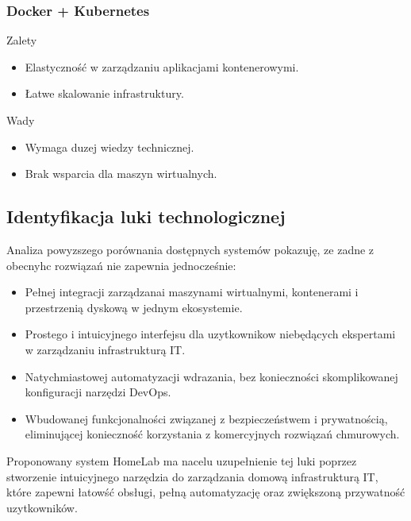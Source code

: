 \subsubsection{Docker + Kubernetes}
\begin{minipage}{0.45\textwidth}
    Zalety
    \begin{itemize}
        \item Elastyczność w zarządzaniu aplikacjami kontenerowymi.
        \item Łatwe skalowanie infrastruktury.
    \end{itemize}
\end{minipage}\hfil
\begin{minipage}{0.45\textwidth}
    Wady
    \begin{itemize}
        \item Wymaga duzej wiedzy technicznej.
        \item Brak wsparcia dla maszyn wirtualnych.
    \end{itemize}
\end{minipage}


\subsection{Identyfikacja luki technologicznej}
Analiza powyzszego porównania dostępnych systemów pokazuję, ze zadne z obecnyhc rozwiązań nie zapewnia jednocześnie:
\begin{itemize}
    \item Pełnej integracji zarządzanai maszynami wirtualnymi, kontenerami i przestrzenią dyskową w jednym ekosystemie.
    \item Prostego i intuicyjnego interfejsu dla uzytkownikow niebędących ekspertami w zarządzaniu infrastrukturą IT.
    \item Natychmiastowej automatyzacji wdrazania, bez konieczności skomplikowanej konfiguracji narzędzi DevOps.
    \item Wbudowanej funkcjonalności związanej z bezpieczeństwem i prywatnością, eliminującej konieczność korzystania z komercyjnych rozwiązań chmurowych.
\end{itemize}

Proponowany system HomeLab ma nacelu uzupełnienie tej luki poprzez stworzenie intuicyjnego narzędzia do zarządzania domową infrastrukturą IT, które zapewni łatowść obsługi, pełną automatyzację oraz zwiększoną przywatność uzytkowników.